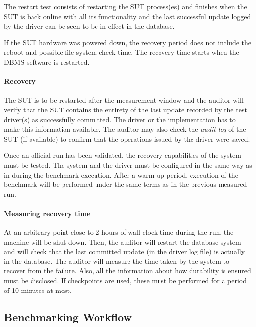 The restart test consists of restarting the SUT process(es) and finishes when the SUT is back online with all its functionality and the last successful update logged by the driver can be seen to be in effect in the database.

If the SUT hardware was powered down, the recovery period does not include the reboot and possible file system check time. The recovery time starts when the DBMS software is restarted.




\paragraph{Recovery}
The SUT is to be restarted after the measurement window and the auditor will verify that the SUT contains the entirety of the last update recorded by the test driver(s) as successfully committed. The driver or the implementation has to make this information available. The auditor may also check the \emph{audit log} of the SUT (if available) to confirm that the operations issued by the driver were saved.

Once an official run has been validated, the recovery capabilities of the system must be tested. The system and the driver must be configured in the same way as in during the benchmark execution. After a warm-up period, execution of the benchmark will be performed under the same terms as in the previous measured run.

\paragraph{Measuring recovery time}
At an arbitrary point close to 2 hours of wall clock time during the run, the machine will be shut down. Then, the auditor will restart the database system and will check that the last committed update (in the driver log file) is actually in the database. The auditor will measure the time taken by the system to recover from the failure. Also, all the information about how durability is ensured must be disclosed. If checkpoints are used, these must be performed for a period of 10 minutes at most.


\subsection{Benchmarking Workflow}
\label{sec:transaction-workload-benchmark-workflow}

